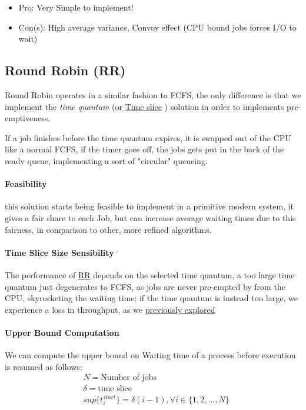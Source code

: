 \documentclass[openright, twoside]{report}
\theoremstyle{definition}
\theoremstyle{example}
\begin{document}
			\begin{itemize}
				\item Pro: Very Simple to implement!
				\item Con(s): High average variance, Convoy effect (CPU bound jobs forces I/O to wait)
			\end{itemize}

		\subsection{Round Robin (RR)}
			\label{ssec:RR}
			Round Robin operates in a similar fashion to FCFS, the only difference is that
			we implement the \emph{time quantum} (or \hyperref[par:times]{Time slice} )
			solution in order to implements pre-emptiveness.

			If a job finishes before the time quantum expires, it is swapped out of the CPU 
			like a normal FCFS, if the timer goes off, the jobs gets put in the back of the 
			ready queue, implementing a sort of "circular" queueing.

			\paragraph{Feasibility}
			this solution starts being feasible to implement in a primitive modern system,
			it gives a fair share to each Job, but can increase average waiting times due 
			to this fairness, in comparison to other, more refined algorithms.

			\paragraph{Time Slice Size Sensibility} 
			The performance of \hyperref[ssec:RR]{RR} depends on the 
			selected time quantum, a too large time quantum just degenerates to FCFS,
			as jobs are never pre-empted by from the CPU, skyrocketing the waiting time;
			if the time quantum is instead too large, we experience a loss in throughput,
			as we \hyperref[par:t_perf]{previously explored}

			\paragraph{Upper Bound Computation}
			We can compute the upper bound on Waiting time of a process before 
			execution is resumed as follows:
			\begin{align*}
				& N = \text{Number of jobs}\\
				& \delta = \text{time slice} \\
				& sup\{ t_i^{start}\} = \delta ( i - 1), \forall i \in \{1, 2, \dots, N\}
			\end{align*}
\end{document}
